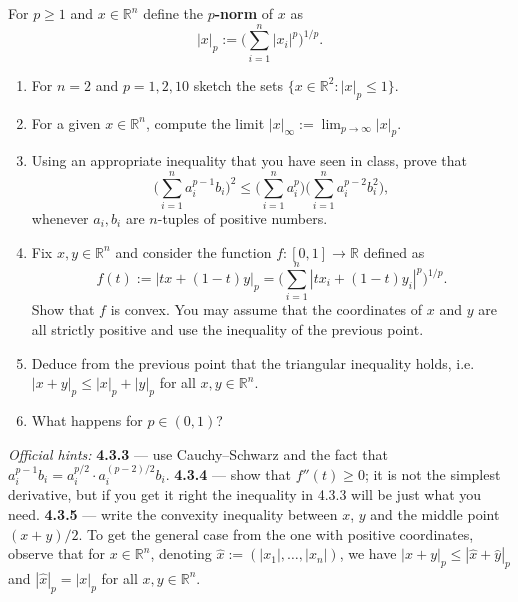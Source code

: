 \begin{exercise}
\label{ex:4.3}
For $p \geq 1$ and $x \in \mathbb{R}^n$ define the \textbf{$p$-norm} of $x$ as
\[|x|_p := \Big(\sum_{i=1}^{n} |x_i|^p\Big)^{1/p}.\]
\begin{enumerate}[label=\textbf{\arabic*.}]
  \item For $n = 2$ and $p = 1, 2, 10$ sketch the sets $\{x \in \mathbb{R}^2 : |x|_p \leq 1\}$.
  \item For a given $x \in \mathbb{R}^n$, compute the limit
    $|x|_\infty := \lim_{p\to\infty}|x|_p$.
  \item Using an appropriate inequality that you have seen in class, prove that
    \[\Big(\sum_{i=1}^{n} a_i^{p-1}b_i\Big)^2 \leq \Big(\sum_{i=1}^{n}a_i^p\Big)\Big(\sum_{i=1}^{n}a_i^{p-2}b_i^2\Big),\]
    whenever $a_i, b_i$ are $n$-tuples of positive numbers.
  \item Fix $x, y \in \mathbb{R}^n$ and consider the function $f : [0,1] \to \mathbb{R}$ defined
    as
    \begin{equation*}
    f(t) := |tx + (1-t)y|_p = \Big(\sum_{i=1}^{n}|tx_i + (1-t)y_i|^p\Big)^{1/p}. \tag{1}
    \end{equation*}
    Show that $f$ is convex. You may assume that the coordinates of $x$ and $y$ are all strictly
    positive and use the inequality of the previous point.
  \item Deduce from the previous point that the triangular inequality holds, i.e.\
    $|x+y|_p \leq |x|_p + |y|_p$ for all $x,y \in \mathbb{R}^n$.
  \item What happens for $p \in (0,1)$?
\end{enumerate}
\textit{Official hints:} \textbf{4.3.3} --- use Cauchy--Schwarz and the fact that
$a_i^{p-1}b_i = a_i^{p/2}\cdot a_i^{(p-2)/2}b_i$. \textbf{4.3.4} --- show that $f''(t) \geq 0$; it
is not the simplest derivative, but if you get it right the inequality in 4.3.3 will be just what
you need. \textbf{4.3.5} --- write the convexity inequality between $x$, $y$ and the middle point
$(x+y)/2$. To get the general case from the one with positive coordinates, observe that for
$x \in \mathbb{R}^n$, denoting $\hat x := (|x_1|,\dots,|x_n|)$, we have
$|x+y|_p \leq |\hat x + \hat y|_p$ and $|\hat x|_p = |x|_p$ for all $x,y \in \mathbb{R}^n$.
\end{exercise}

